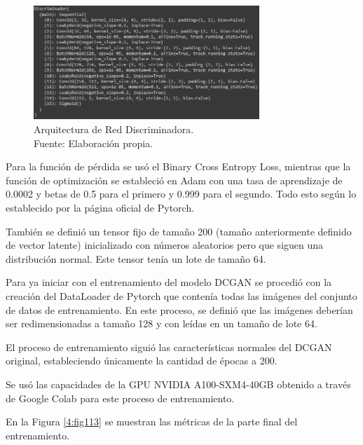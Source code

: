 \begin{figure}[H]
	\begin{center}
		\includegraphics[width=0.76\textwidth]{4/figures/discriminator_network.PNG}
		\caption[Arquitectura de Red Discriminadora]{Arquitectura de Red Discriminadora. \\
		Fuente: Elaboración propia.}
		\label{4:fig112}
	\end{center}
\end{figure}

Para la función de pérdida se usó el Binary Cross Entropy Loss, mientras que la función de optimización se estableció en Adam con una tasa de aprendizaje de 0.0002 y betas de 0.5 para el primero y 0.999 para el segundo. Todo esto según lo establecido por la página oficial de Pytorch.

También se definió un tensor fijo de tamaño 200 (tamaño anteriormente definido de vector latente) inicializado con números aleatorios pero que siguen una distribución normal. Este tensor tenía un lote de tamaño 64.

Para ya iniciar con el entrenamiento del modelo DCGAN se procedió con la creación del DataLoader de Pytorch que contenía todas las imágenes del conjunto de datos de entrenamiento. En este proceso, se definió que las imágenes deberían ser redimensionadas a tamaño 128 y con leídas en un tamaño de lote 64.

El proceso de entrenamiento siguió las características normales del DCGAN original, estableciendo únicamente la cantidad de épocas a 200.

Se usó las capacidades de la GPU NVIDIA A100-SXM4-40GB obtenido a través de Google Colab para este proceso de entrenamiento.

En la Figura \ref{4:fig113} se muestran las métricas de la parte final del entrenamiento.

